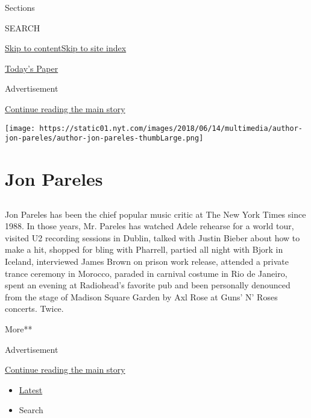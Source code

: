Sections

SEARCH

\protect\hyperlink{site-content}{Skip to
content}\protect\hyperlink{site-index}{Skip to site index}

\href{https://myaccount.nytimes.com/auth/login?response_type=cookie\&client_id=vi}{}

\href{https://www.nytimes.com/section/todayspaper}{Today's Paper}

Advertisement

\protect\hyperlink{after-top}{Continue reading the main story}

\texttt{[image: https://static01.nyt.com/images/2018/06/14/multimedia/author-jon-pareles/author-jon-pareles-thumbLarge.png]}

\hypertarget{jon-pareles}{%
\section{Jon Pareles}\label{jon-pareles}}

\subsection{}

Jon Pareles has been the chief popular music critic at The New York
Times since 1988. In those years, Mr. Pareles has watched Adele rehearse
for a world tour, visited U2 recording sessions in Dublin, talked with
Justin Bieber about how to make a hit, shopped for bling with Pharrell,
partied all night with Bjork in Iceland, interviewed James Brown on
prison work release, attended a private trance ceremony in Morocco,
paraded in carnival costume in Rio de Janeiro, spent an evening at
Radiohead's favorite pub and been personally denounced from the stage of
Madison Square Garden by Axl Rose at Guns' N' Roses concerts. Twice.

More**

Advertisement

\protect\hyperlink{after-mid1}{Continue reading the main story}

\begin{itemize}
\tightlist
\item
  \protect\hyperlink{stream-panel}{Latest}
\item
  Search
\end{itemize}


